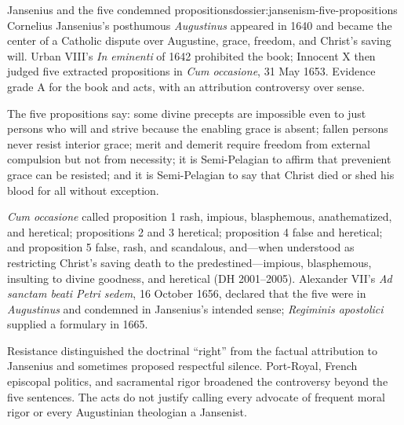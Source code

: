 \begin{heresydossier}{Jansenius and the five condemned propositions}{dossier:jansenism-five-propositions}
\objectfield Cornelius Jansenius's posthumous \emph{Augustinus} appeared in 1640 and became the center of a Catholic dispute over Augustine, grace, freedom, and Christ's saving will. Urban VIII's \emph{In eminenti} of 1642 prohibited the book; Innocent X then judged five extracted propositions in \emph{Cum occasione}, 31 May 1653. Evidence grade A for the book and acts, with an attribution controversy over sense.

\propositionfield The five propositions say: some divine precepts are impossible even to just persons who will and strive because the enabling grace is absent; fallen persons never resist interior grace; merit and demerit require freedom from external compulsion but not from necessity; it is Semi-Pelagian to affirm that prevenient grace can be resisted; and it is Semi-Pelagian to say that Christ died or shed his blood for all without exception.

\responsefield \emph{Cum occasione} called proposition 1 rash, impious, blasphemous, anathematized, and heretical; propositions 2 and 3 heretical; proposition 4 false and heretical; and proposition 5 false, rash, and scandalous, and---when understood as restricting Christ's saving death to the predestined---impious, blasphemous, insulting to divine goodness, and heretical (DH 2001--2005). Alexander VII's \emph{Ad sanctam beati Petri sedem}, 16 October 1656, declared that the five were in \emph{Augustinus} and condemned in Jansenius's intended sense; \emph{Regiminis apostolici} supplied a formulary in 1665.

\aftermathfield Resistance distinguished the doctrinal ``right'' from the factual attribution to Jansenius and sometimes proposed respectful silence. Port-Royal, French episcopal politics, and sacramental rigor broadened the controversy beyond the five sentences. The acts do not justify calling every advocate of frequent moral rigor or every Augustinian theologian a Jansenist.
\end{heresydossier}

